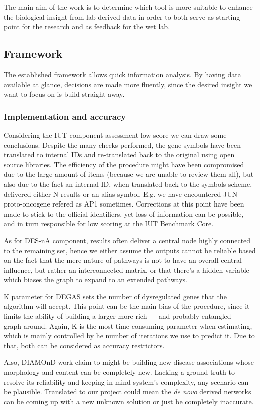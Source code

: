 The main aim of the work is to determine which tool is more suitable to enhance the biological insight from lab-derived data in order to both serve as starting point for the research and as feedback for the wet lab.

\subsection{Framework}
The established framework allows quick information analysis. By having data available at glance, decisions are made more fluently, since the desired insight we want to focus on is build straight away.

\subsubsection{Implementation and accuracy}
Considering the IUT component assessment low score we can draw some conclusions. Despite the many checks performed, the gene symbols have been translated to internal IDs and re-translated back to the original using open source libraries. The efficiency of the procedure might have been compromised due to the large amount of items (because we are unable to review them all), but also due to the fact an internal ID, when translated back to the symbols scheme, delivered either N results or an alias symbol. E.g. we have encountered JUN proto-oncogene refered as AP1 sometimes. Corrections at this point have been made to stick to the official identifiers, yet loss of information can be possible, and in turn responsible for low scoring at the IUT Benchmark Core.

As for DES-nA component, results often deliver a central node highly connected to the remaining set, hence we either assume the outputs cannot be reliable based on the fact that the mere nature of pathways is not to have an overall central influence, but rather an interconnected matrix, or that there’s a hidden variable which biases the graph to expand to an extended pathways.

K  parameter for DEGAS sets the number of dysregulated genes that the algorithm will accept. This point can be the main bias of the procedure, since it limits the ability of building a larger more rich — and  probably entangled— graph around. Again, K is the most time-consuming parameter when estimating, which is mainly controlled by he number of iterations we use to predict it. Due to that, both can be considered as accuracy restrictors.

Also, DIAMOnD work claim to might be building new disease associations whose morphology and content can be completely new. Lacking a ground truth to resolve its reliability and keeping in mind system’s complexity, any scenario can be plausible. Translated to our project could mean the \textit{de novo} derived networks can be coming up with a new unknown solution or just be completely inaccurate. 

